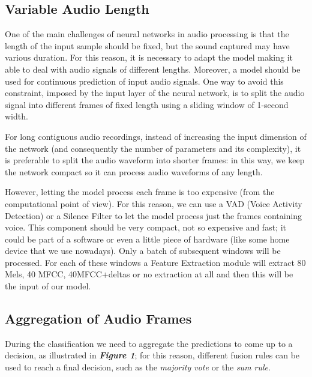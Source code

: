 \documentclass[conference]{IEEEtran}
\begin{document}
\subsection{Variable Audio Length}
One of the main challenges of neural networks in audio processing is that the length of the input sample should be fixed, but the sound captured may have various duration. For this reason, it is necessary to adapt the model making it able to deal with audio signals of different lengths. Moreover, a model should be used for continuous prediction of input audio signals. One way to avoid this constraint, imposed by the input layer of the neural network, is to split the audio signal into different frames of fixed length using a sliding window of 1-second width.

For long contiguous audio recordings, instead of increasing the input dimension of the network (and consequently the number of parameters and its complexity), it is preferable to split the audio waveform into shorter frames: in this way, we keep the network compact so it can process audio waveforms of any length.

However, letting the model process each frame is too expensive (from the computational point of view). For this reason, we can use a VAD (Voice Activity Detection) or a Silence Filter to let the model process just the frames containing voice. This component should be very compact, not so expensive and fast; it could be part of a software or even a little piece of hardware (like some home device that we use nowadays).
Only a batch of subsequent windows will be processed. For each of these windows a Feature Extraction module will extract 80 Mels, 40 MFCC, 40MFCC+deltas or no extraction at all and then this will be the input of our model.

\subsection{Aggregation of Audio Frames}
During the classification we need to aggregate the predictions to come up to a decision, as illustrated in \textbf{\textit{Figure 1}}; for this reason, different fusion rules can be used to reach a final decision, such as the \textit{majority vote} or the \textit{sum rule}.
\end{document}
